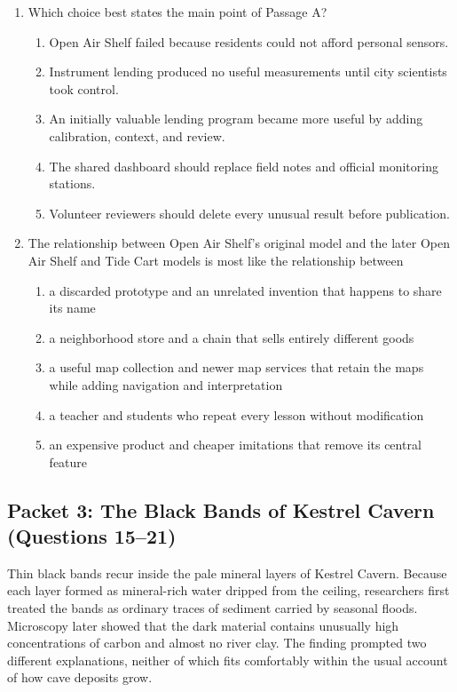 \begin{enumerate}
\item Which choice best states the main point of Passage A?
\begin{enumerate}
\item Open Air Shelf failed because residents could not afford personal sensors.
\item Instrument lending produced no useful measurements until city scientists took control.
\item An initially valuable lending program became more useful by adding calibration, context, and review.
\item The shared dashboard should replace field notes and official monitoring stations.
\item Volunteer reviewers should delete every unusual result before publication.
\end{enumerate}

\item The relationship between Open Air Shelf's original model and the later Open Air Shelf and Tide Cart models is most like the relationship between
\begin{enumerate}
\item a discarded prototype and an unrelated invention that happens to share its name
\item a neighborhood store and a chain that sells entirely different goods
\item a useful map collection and newer map services that retain the maps while adding navigation and interpretation
\item a teacher and students who repeat every lesson without modification
\item an expensive product and cheaper imitations that remove its central feature
\end{enumerate}
\end{enumerate}

\subsection*{Packet 3: The Black Bands of Kestrel Cavern (Questions 15--21)}

Thin black bands recur inside the pale mineral layers of Kestrel Cavern. Because each layer
formed as mineral-rich water dripped from the ceiling, researchers first treated the bands
as ordinary traces of sediment carried by seasonal floods. Microscopy later showed that the
dark material contains unusually high concentrations of carbon and almost no river clay.
The finding prompted two different explanations, neither of which fits comfortably within
the usual account of how cave deposits grow.

